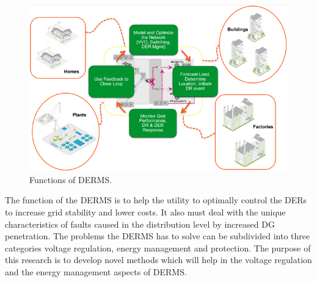\begin{figure}[!h]
\centering
\includegraphics[width=0.85\linewidth]{figs/DERMS_ARCH.png}
\caption[Functions of DERMS.]{Functions of DERMS. \cite{DERMS_1}}
\label{fig:DERMS_ARCH}
\end{figure}

The function of the DERMS is to help the utility to optimally control the DERs to increase grid stability and lower costs. It also must deal with the unique characteristics of faults caused in the distribution level by increased DG penetration. The problems the DERMS has to solve can be subdivided into three categories voltage regulation, energy management and protection. The purpose of this research is to develop novel methods which will help in the voltage regulation and the energy management aspects of DERMS.






